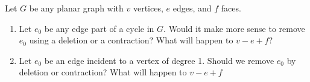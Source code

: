 \documentclass{book}
\begin{document}
\setcounter{project}{24}
\addtocounter{project}{-1}
\begin{activity}[]\label{activity-19}
\hypertarget{p-270}{}%
Let \(G\) be any planar graph with \(v\) vertices, \(e\) edges, and \(f\) faces.%
\begin{enumerate}[font=\bfseries,label=(\alph*),ref=\alph*]
\item\label{task-31} \hypertarget{p-271}{}%
Let \(e_0\) be any edge part of a cycle in \(G\).  Would it make more sense to remove \(e_0\) using a deletion or a contraction?  What will happen to \(v - e + f\)?%
\item\label{task-32} \hypertarget{p-272}{}%
Let \(e_0\) be an edge incident to a vertex of degree 1.  Should we remove \(e_0\) by deletion or contraction?  What will happen to \(v- e + f\)%
\end{enumerate}
\end{activity}

\clearpage
\end{document}
